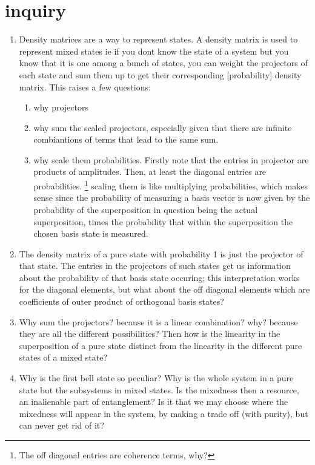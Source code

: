 \documentclass[a4paper,12pt]{amsbook}
\newcommand{\0}{{$|0\rangle$}}
\newcommand{\1}{{$|1\rangle$}}
\begin{document}
\section{inquiry}

\begin{enumerate}
    \item Density matrices are a way to represent states. A density matrix is used to represent mixed states ie if you dont know the state of a system but you know that it is one among a bunch of states, you can weight the projectors of each state and sum them up to get their corresponding [probability] density matrix. This raises a few questions: \begin{enumerate} \item why projectors \item why sum the scaled projectors, especially given that there are infinite combiantions of terms that lead to the same sum. \item why scale them probabilities. Firstly note that the entries in projector are products of amplitudes. Then, at least the diagonal entries are probabilities. \footnote{The off diagonal entries are coherence terms, why?} scaling them is like multiplying probabilities, which makes sense since the probability of measuring a basis vector is now given by the probability of the superposition in question being the actual superposition, times the probability that within the superposition the chosen basis state is measured.  \end{enumerate} 
\item The density matrix of a pure state with probability 1 is just the projector of that state. The entries in the projectors of such states get us information about the probability of that basis state occuring; this interpretation works for the diagonal elements, but what about the off diagonal elements which are coefficients of outer product of orthogonal basis states?
\item Why sum the projectors? because it is a linear combination? why? because they are all the different possibilities? Then how is the linearity in the superposition of a pure state distinct from the linearity in the different pure states of a mixed state?
    \item Why is the first bell state so peculiar? Why is the whole system in a pure state but the subsystems in mixed states. Is the mixedness then a resource, an inalienable part of entanglement? Is it that we may choose where the mixedness will appear in the system, by making a trade off (with purity), but can never get rid of it? 
\end{enumerate}
\end{document}
